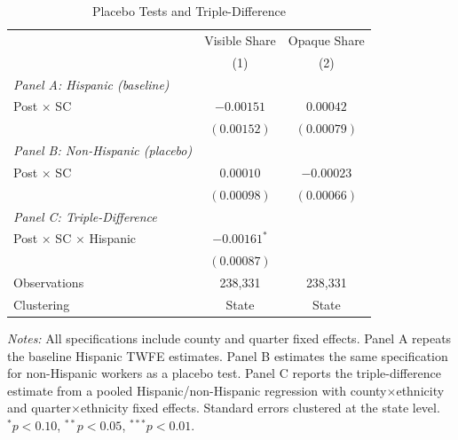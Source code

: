 \begin{table}[htbp]
\centering
\begin{threeparttable}
\caption{Placebo Tests and Triple-Difference}
\label{tab:placebo}
\begin{tabular}{lcc}
\toprule
 & Visible Share & Opaque Share \\
 & (1) & (2) \\
\midrule
\textit{Panel A: Hispanic (baseline)} & & \\
Post $\times$ SC & $-0.00151$ & $0.00042$ \\
 & $(0.00152)$ & $(0.00079)$ \\
\addlinespace
\textit{Panel B: Non-Hispanic (placebo)} & & \\
Post $\times$ SC & $0.00010$ & $-0.00023$ \\
 & $(0.00098)$ & $(0.00066)$ \\
\addlinespace
\textit{Panel C: Triple-Difference} & & \\
Post $\times$ SC $\times$ Hispanic & $-0.00161^{*}$ & \\
 & $(0.00087)$ & \\
\addlinespace
Observations & 238,331 & 238,331 \\
Clustering & State & State \\
\bottomrule
\end{tabular}
\begin{tablenotes}[flushleft]
\small
\item \textit{Notes:} All specifications include county and quarter fixed effects. Panel A repeats the baseline Hispanic TWFE estimates. Panel B estimates the same specification for non-Hispanic workers as a placebo test. Panel C reports the triple-difference estimate from a pooled Hispanic/non-Hispanic regression with county$\times$ethnicity and quarter$\times$ethnicity fixed effects. Standard errors clustered at the state level. $^{*}p<0.10$, $^{**}p<0.05$, $^{***}p<0.01$.
\end{tablenotes}
\end{threeparttable}
\end{table}
